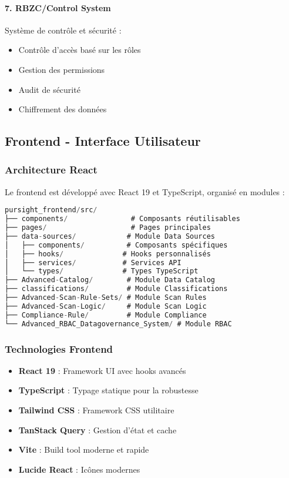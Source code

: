 \documentclass[12pt,a4paper]{article}
\begin{document}
\paragraph{7. RBZC/Control System}
Système de contrôle et sécurité :
\begin{itemize}
    \item Contrôle d'accès basé sur les rôles
    \item Gestion des permissions
    \item Audit de sécurité
    \item Chiffrement des données
\end{itemize}

\subsection{Frontend - Interface Utilisateur}

\subsubsection{Architecture React}
Le frontend est développé avec React 19 et TypeScript, organisé en modules :

\begin{lstlisting}[language=JavaScript, caption=Structure du frontend]
pursight_frontend/src/
├── components/               # Composants réutilisables
├── pages/                    # Pages principales
├── data-sources/            # Module Data Sources
│   ├── components/          # Composants spécifiques
│   ├── hooks/              # Hooks personnalisés
│   ├── services/           # Services API
│   └── types/              # Types TypeScript
├── Advanced-Catalog/        # Module Data Catalog
├── classifications/         # Module Classifications
├── Advanced-Scan-Rule-Sets/ # Module Scan Rules
├── Advanced-Scan-Logic/     # Module Scan Logic
├── Compliance-Rule/         # Module Compliance
└── Advanced_RBAC_Datagovernance_System/ # Module RBAC
\end{lstlisting}

\subsubsection{Technologies Frontend}

\begin{itemize}
    \item \textbf{React 19} : Framework UI avec hooks avancés
    \item \textbf{TypeScript} : Typage statique pour la robustesse
    \item \textbf{Tailwind CSS} : Framework CSS utilitaire
    \item \textbf{TanStack Query} : Gestion d'état et cache
    \item \textbf{Vite} : Build tool moderne et rapide
    \item \textbf{Lucide React} : Icônes modernes
\end{itemize}
\end{document}
